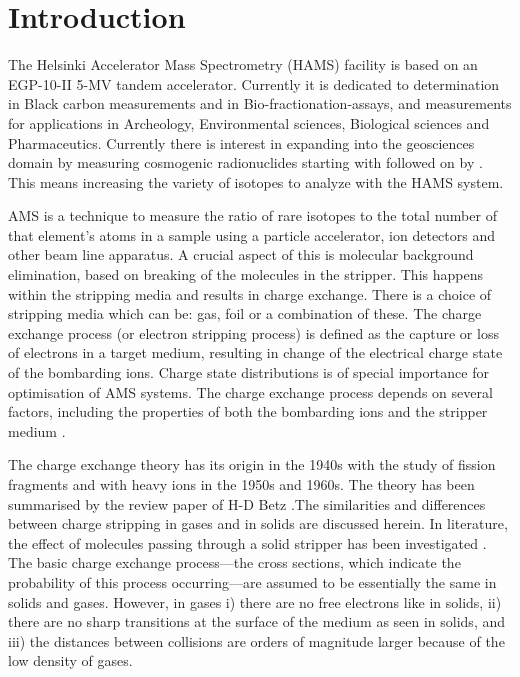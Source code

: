 \documentclass[a4paper,fleqn,review]{cas-sc}
\begin{document}
\section{Introduction}
 The Helsinki Accelerator Mass Spectrometry (HAMS) facility is based on an EGP-10-II 5-MV tandem accelerator. Currently it is dedicated to  determination in Black carbon measurements and in Bio-fractionation-assays, and  measurements for applications in Archeology, Environmental sciences, Biological sciences and Pharmaceutics.
Currently there is interest in expanding into the geosciences domain by measuring cosmogenic radionuclides starting with  followed on by . This means increasing the variety of isotopes to analyze with the HAMS system.  

AMS is a technique to measure the ratio of rare isotopes to the total number of that element’s atoms in a sample using a particle accelerator, ion detectors and other beam line apparatus. A crucial aspect of this is molecular background elimination, based on breaking of the molecules in the stripper. This happens within the stripping media and results in charge exchange. There is a choice of stripping media which can be: gas, foil or a combination of these.
The charge exchange process (or electron stripping process) is defined as the capture or loss of electrons in a target medium, resulting in change of the electrical charge state of the bombarding ions. Charge state distributions is of special importance for optimisation of AMS systems. The charge exchange process depends on several factors, including the properties of both the bombarding ions and the stripper medium \cite{betz1971review, betz1972charge}. 

The charge exchange theory has its origin in the 1940s with the study of fission fragments and with heavy ions in the 1950s and 1960s. The theory has been summarised by the review paper of H-D Betz \cite{betz1972charge}.The similarities and differences between charge stripping in gases and in solids are discussed herein. In literature, the effect of molecules passing through a solid stripper has been investigated  \cite{maor1985charge, brunelle1999reduced, kumar2011charge}. The basic charge exchange process---the cross sections, which indicate the probability of this process occurring---are assumed to be essentially the same in solids and gases. However, in gases i) there are no free electrons like in solids, ii)  there are no sharp transitions at the surface of the medium as seen in solids, and iii) the distances between collisions are orders of magnitude larger because of the low density of gases.  
\end{document}
